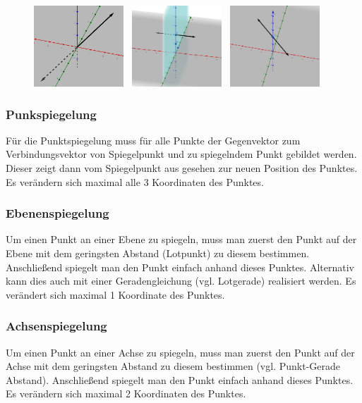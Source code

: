 \begin{figure}[H]
    \centering
    \includegraphics[width=0.3\textwidth]{images/3d-point-reflection.png} \,
    \includegraphics[width=0.3\textwidth]{images/3d-plane-reflection.png} \,
    \includegraphics[width=0.3\textwidth]{images/3d-axis-reflection.png}
\end{figure}

\subsubsection{Punkspiegelung}
Für die Punktspiegelung muss für alle Punkte der Gegenvektor zum  Verbindungsvektor von
Spiegelpunkt und zu spiegelndem Punkt gebildet werden. Dieser zeigt dann vom Spiegelpunkt
aus gesehen zur neuen Position des Punktes.
Es verändern sich maximal alle 3 Koordinaten des Punktes.

\subsubsection{Ebenenspiegelung}
Um einen Punkt an einer Ebene zu spiegeln, muss man zuerst den Punkt auf der
Ebene mit dem geringsten Abstand (Lotpunkt) zu diesem bestimmen. Anschließend
spiegelt man den Punkt einfach anhand dieses Punktes. Alternativ kann dies
auch mit einer Geradengleichung (vgl. Lotgerade) realisiert werden.
Es verändert sich maximal 1 Koordinate des Punktes.

\subsubsection{Achsenspiegelung}
Um einen Punkt an einer Achse zu spiegeln, muss man zuerst den Punkt auf der
Achse mit dem geringsten Abstand zu diesem bestimmen (vgl. Punkt-Gerade Abstand).
Anschließend spiegelt man den Punkt einfach anhand dieses Punktes.
Es verändern sich maximal 2 Koordinaten des Punktes.

